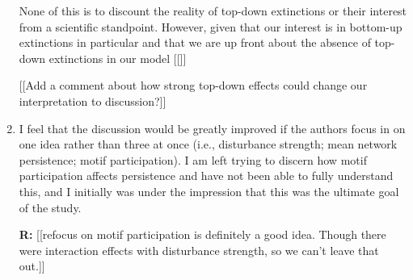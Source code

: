 \documentclass[12pt]{article}
\begin{document}
\begin{enumerate}
                None of this is to discount the reality of top-down extinctions or their interest from a scientific standpoint. However, given that our interest is in bottom-up extinctions in particular and that we are up front about the absence of top-down extinctions in our model [[]]


                [[Add a comment about how strong top-down effects could change our interpretation to discussion?]]


            \item I feel that the discussion would be greatly improved if the authors focus in on one idea rather than three at once (i.e., disturbance strength; mean network persistence; motif participation). I am left trying to discern how motif participation affects persistence and have not been able to fully understand this, and I initially was under the impression that this was the ultimate goal of the study.

                \textbf{R:}
                [[refocus on motif participation is definitely a good idea. Though there were interaction effects with disturbance strength, so we can't leave that out.]]


        \end{enumerate}

\clearpage

     
\end{document}
